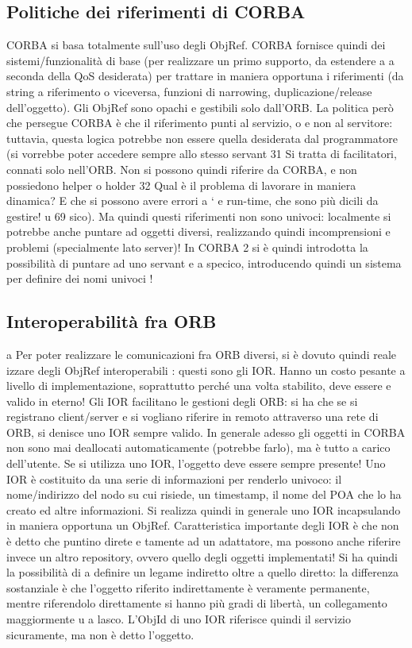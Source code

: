 \documentclass[a4paper,12pt]{article}
\begin{document}
\subsection{Politiche dei riferimenti di CORBA}
CORBA si basa totalmente sull'uso degli ObjRef. CORBA fornisce quindi dei
sistemi/funzionalità di base (per realizzare un primo supporto, da estendere a
a
seconda della QoS desiderata) per trattare in maniera opportuna i riferimenti
(da string a riferimento o viceversa, funzioni di narrowing, duplicazione/release
dell'oggetto). Gli ObjRef sono opachi e gestibili solo dall'ORB.
La politica però che persegue CORBA è che il riferimento punti al servizio,
o
e
non al servitore: tuttavia, questa logica potrebbe non essere quella desiderata dal programmatore (si vorrebbe poter
accedere sempre allo stesso servant
31 Si tratta di facilitatori, connati solo nell'ORB. Non si possono quindi riferire da CORBA,
e non possiedono helper o holder
32 Qual è il problema di lavorare in maniera dinamica? E che si possono avere errori a
`
e
run-time, che sono più dicili da gestire!
u
69
sico). Ma quindi questi riferimenti non sono univoci: localmente si potrebbe
anche puntare ad oggetti diversi, realizzando quindi incomprensioni e problemi
(specialmente lato server)!
In CORBA 2 si è quindi introdotta la possibilità di puntare ad uno servant
e
a
specico, introducendo quindi un sistema per definire dei nomi univoci !
\subsection{Interoperabilità fra ORB}
a
Per poter realizzare le comunicazioni fra ORB diversi, si è dovuto quindi reale
izzare degli ObjRef interoperabili : questi sono gli IOR. Hanno un costo pesante
a livello di implementazione, soprattutto perché una volta stabilito, deve essere
e
valido in eterno!
Gli IOR facilitano le gestioni degli ORB: si ha che se si registrano client/server
e si vogliano riferire in remoto attraverso una rete di ORB, si denisce uno IOR
sempre valido. In generale adesso gli oggetti in CORBA non sono mai deallocati
automaticamente (potrebbe farlo), ma è tutto a carico dell'utente. Se si utilizza uno IOR, l'oggetto deve essere
sempre presente!
Uno IOR è costituito da una serie di informazioni per renderlo univoco: il nome/indirizzo del nodo su cui risiede, un
timestamp, il nome del POA che lo ha
creato ed altre informazioni. Si realizza quindi in generale uno IOR incapsulando
in maniera opportuna un ObjRef.
Caratteristica importante degli IOR è che non è detto che puntino direte
e
tamente ad un adattatore, ma possono anche riferire invece un altro repository, ovvero quello degli oggetti
implementati! Si ha quindi la possibilità di
a
definire un legame indiretto oltre a quello diretto: la differenza sostanziale è che l'oggetto riferito indirettamente è
veramente permanente, mentre riferendolo direttamente si hanno più gradi di libertà, un collegamento maggiormente
u
a
lasco. L'ObjId di uno IOR riferisce quindi il servizio sicuramente, ma non è detto l'oggetto.
\end{document}
